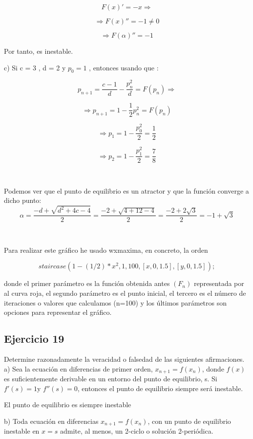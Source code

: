 \documentclass[11pt, a4paper, titlepage]{article}
\theoremstyle{theorem-style}
\theoremstyle{definition-style}
\theoremstyle{remark-style}
\theoremstyle{example-style}
\begin{document}
\[
F(x)' = -x \Rightarrow
\]

\[
\Rightarrow F(x)'' = -1 \neq 0
\]

\[
\Rightarrow F(\alpha)'' = -1
\]

Por tanto, es inestable.

c) Si c = 3 , d = 2 y $p_0 = 1$ , entonces usando que : 

\[
p_{n+1} = \frac{c-1}{d} - \frac{p_{n}^{2}}{d} = F(p_n) \Rightarrow
\]

\[
\Rightarrow p_{n+1} = 1 - \frac{1}{2}p_n^{2} = F(p_n)
\]

\[
\Rightarrow p_1 = 1 - \frac{p_0^{2}}{2} = \frac{1}{2}
\]

\[
\Rightarrow p_2 = 1 - \frac{p_1^{2}}{2} = \frac{7}{8}
\]

\

Podemos ver que el punto de equilibrio es un atractor y que la funci\'on converge a dicho punto:
\[
\alpha = \frac{-d+\sqrt{d^{2} +4c-4}}{2} = \frac{-2+\sqrt{4 +12-4}}{2} = \frac{-2+2\sqrt{3}}{2} = -1+\sqrt{3}  
\]

\

Para realizar este gr\'afico he usado wxmaxima, en concreto, la orden 

\[
staircase(1-(1/2)*x^2,1,100,[x,0,1.5],[y,0,1.5]);
\]

donde el primer parámetro es la función obtenida antes $(F_n)$ representada por al curva roja, el segundo parámetro es el punto inicial, el tercero es el número de iteraciones o valores que calculamos (n=100) y los últimos parámetros son opciones para representar el gráfico.

\subsection{Ejercicio 19}

Determine razonadamente la veracidad o falsedad de las siguientes afirmaciones.
a) Sea la ecuación en diferencias de primer orden, $x _{n+1} = f (x_n )$, donde $f(x)$ es suficientemente derivable en
un entorno del punto de equilibrio, s. Si $f'(s) = 1 $y $f'' (s) = 0$, entonces el punto de equilibrio siempre será
inestable.

El punto de equilibrio es siempre inestable


b) Toda ecuación en diferencias $x _{n+1} = f (x_n)$, con un punto de equilibrio inestable en $x = s$ admite, al menos,
un 2-ciclo o solución 2-periódica.
\end{document}
